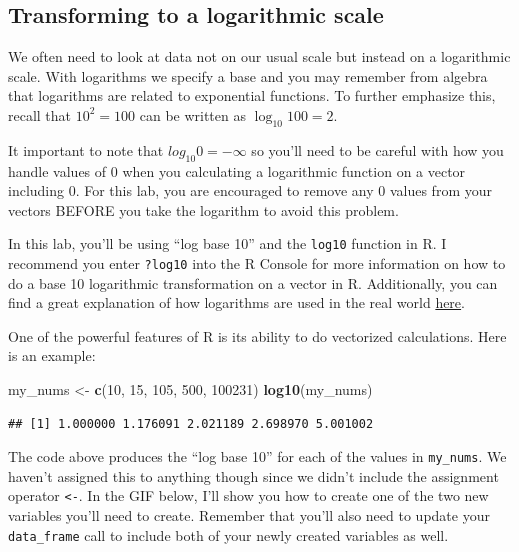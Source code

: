 \documentclass[]{tufte-book}
\newenvironment{Shaded}{\begin{snugshade}}{\end{snugshade}}
\newcommand{\KeywordTok}[1]{\textcolor[rgb]{0.13,0.29,0.53}{\textbf{{#1}}}}
\newcommand{\DecValTok}[1]{\textcolor[rgb]{0.00,0.00,0.81}{{#1}}}
\newcommand{\StringTok}[1]{\textcolor[rgb]{0.31,0.60,0.02}{{#1}}}
\newcommand{\NormalTok}[1]{{#1}}
\begin{document}
\subsection{Transforming to a logarithmic
scale}\label{transforming-to-a-logarithmic-scale}

We often need to look at data not on our usual scale but instead on a
logarithmic scale. With logarithms we specify a base and you may
remember from algebra that logarithms are related to exponential
functions. To further emphasize this, recall that \(10^2 = 100\) can be
written as \(\log_{10}100 = 2\).

It important to note that \(log_{10}0 = -\infty\) so you'll need to be
careful with how you handle values of 0 when you calculating a
logarithmic function on a vector including 0. For this lab, you are
encouraged to remove any 0 values from your vectors BEFORE you take the
logarithm to avoid this problem.

In this lab, you'll be using ``log base 10'' and the \texttt{log10}
function in R. I recommend you enter \texttt{?log10} into the R Console
for more information on how to do a base 10 logarithmic transformation
on a vector in R. Additionally, you can find a great explanation of how
logarithms are used in the real world
\href{https://betterexplained.com/articles/using-logs-in-the-real-world/}{here}.

One of the powerful features of R is its ability to do vectorized
calculations. Here is an example:

\begin{Shaded}
\begin{Highlighting}[]
\NormalTok{my_nums <-}\StringTok{ }\KeywordTok{c}\NormalTok{(}\DecValTok{10}\NormalTok{, }\DecValTok{15}\NormalTok{, }\DecValTok{105}\NormalTok{, }\DecValTok{500}\NormalTok{, }\DecValTok{100231}\NormalTok{)}
\KeywordTok{log10}\NormalTok{(my_nums)}
\end{Highlighting}
\end{Shaded}

\begin{verbatim}
## [1] 1.000000 1.176091 2.021189 2.698970 5.001002
\end{verbatim}

The code above produces the ``log base 10'' for each of the values in
\texttt{my\_nums}. We haven't assigned this to anything though since we
didn't include the assignment operator \texttt{\textless{}-}. In the GIF
below, I'll show you how to create one of the two new variables you'll
need to create. Remember that you'll also need to update your
\texttt{data\_frame} call to include both of your newly created
variables as well.
\end{document}
